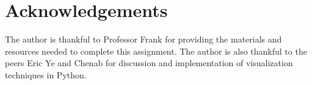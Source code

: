 \documentclass[11pt]{amsart}
\begin{document}
\section*{Acknowledgements}

The author is thankful to Professor Frank for providing the materials and resources needed to complete this assignment. The author is also thankful to the peers Eric Ye and Chenab for discussion and implementation of visualization techniques in Python.



\end{document}
